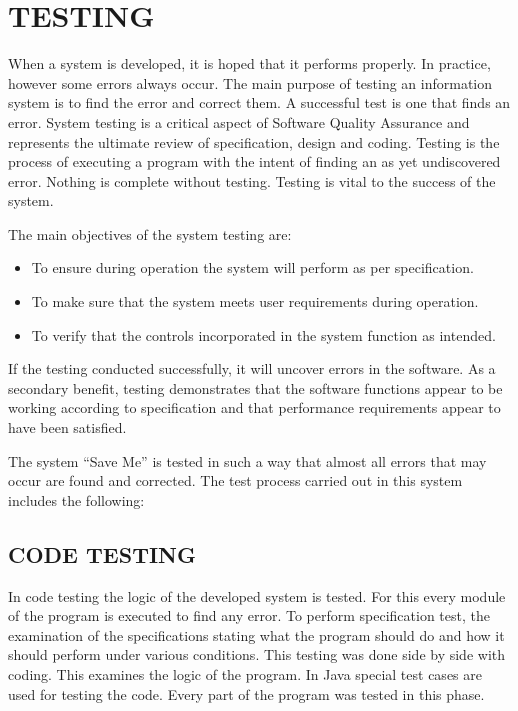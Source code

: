 \documentclass[12pt,a4paper,oneside]{report}
\begin{document}
{\chapter{TESTING}
\par When a system is developed, it is hoped that it performs properly. In practice, however some errors always occur. The main purpose of testing an information system is to find the error and correct them. A successful test is one that finds an error. System testing is a critical aspect of Software Quality Assurance and represents the ultimate review of specification, design and coding. Testing is the process of executing a program with the intent of finding an as yet undiscovered error. Nothing is complete without testing. Testing is vital to the success of the system.\\
\par The main objectives of the system testing are:\\
\begin{itemize}
\item To ensure during operation the system will perform as per specification. 
\item To make sure that the system meets user requirements during operation.
\item To verify that the controls incorporated in the system function as intended.
\end{itemize}
\par If the testing conducted successfully, it will uncover errors in the software. As a secondary benefit, testing demonstrates that the software functions appear to be working according to specification and that performance requirements appear to have been satisfied.\\
\par The system “Save Me” is tested in such a way that almost all errors that may occur are found and corrected. The test process carried out in this system includes the following:\\
\section{CODE TESTING}
\par In code testing the logic of the developed system is tested. For this every module of the program is executed to find any error. To perform specification test, the examination of the specifications stating what the program should do and how it should perform under various conditions. This testing was done side by side with coding. This examines the logic of the program. In Java special test cases are used for testing the code. Every part of the program was tested in this phase.

}
\end{document}
